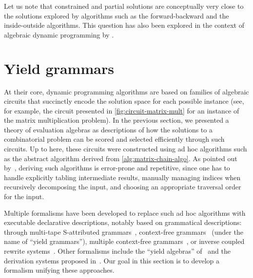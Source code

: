 Let us note that constrained and partial solutions are conceptually very close to the solutions explored by algorithms such as the forward-backward and the inside-outside algorithms.
This question has also been explored in the context of algebraic dynamic programming by \textcite{Siederdissen2015AlgebraicDynamicProgramming}.


\section{Yield grammars}\label{sec:adp:yield-gram}


At their core, dynamic programming algorithms are based on families of algebraic circuits that succinctly encode the solution space for each possible instance (see, for example, the circuit presented in \cref{fig:circuit-matrix-mult} for an instance of the matrix multiplication problem).
In the previous section, we presented a theory of evaluation algebras as descriptions of how the solutions to a combinatorial problem can be scored and selected efficiently through such circuits.
Up to here, these circuits were constructed using ad hoc algorithms such as the abstract algorithm derived from \cref{alg:matrix-chain-algo}.
As pointed out by~\textcite{Giegerich2004DisciplineDynamicProgramming},
deriving such algorithms is error-prone and repetitive, since one has to handle explicitly
tabling intermediate results,
manually managing indices when recursively decomposing the input,
and choosing an appropriate traversal order for the input.

Multiple formalisms have been developed to replace such ad hoc algorithms with executable declarative descriptions, notably based on grammatical descriptions: through
multi-tape S-attributed grammars~\parencite{Lefebvre1996GrammarBasedUnificationSeveral},
context-free grammars~\parencite{Giegerich2004DisciplineDynamicProgramming} (under the name of \enquote{yield grammars}),
multiple context-free grammars~\parencite{Riechert2016AlgebraicDynamicProgramming},
or inverse coupled rewrite systems~\parencite{Giegerich2014ModelingDynamicProgramming}.
Other formalisms include
the \enquote{yield algebras} of~\textcite{Miklos2019AlgebraicDynamicProgramming}
and the derivation systems proposed in~\textcite[section~2.6]{Michalik2019NonredundantSamplingRNA}.
Our goal in this section is to develop a formalism unifying these approaches.

